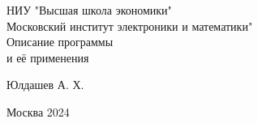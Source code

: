 \begin{center} 

\large НИУ "Высшая школа экономики"\\ 
\large Московский институт электроники и математики"\\[5.5cm] 

\huge Описание программы  \\[0.6cm] %
\large и её применения\\[3.7cm]


\end{center} 

\begin{flushright}
Юлдашев А. Х.  \\
\end{flushright}


\vfill 

\begin{center} 
\large Москва 2024
\end{center} 

\thispagestyle{empty}
